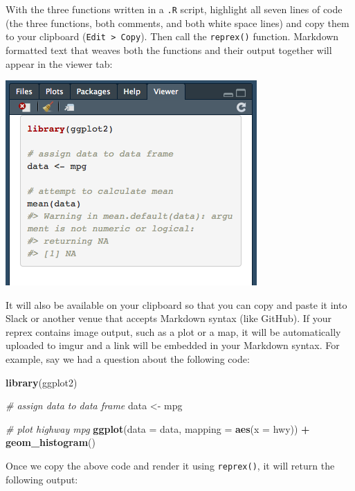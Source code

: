 \documentclass[]{book}
\newenvironment{Shaded}{\begin{snugshade}}{\end{snugshade}}
\newcommand{\KeywordTok}[1]{\textcolor[rgb]{0.13,0.29,0.53}{\textbf{#1}}}
\newcommand{\DataTypeTok}[1]{\textcolor[rgb]{0.13,0.29,0.53}{#1}}
\newcommand{\StringTok}[1]{\textcolor[rgb]{0.31,0.60,0.02}{#1}}
\newcommand{\CommentTok}[1]{\textcolor[rgb]{0.56,0.35,0.01}{\textit{#1}}}
\newcommand{\OperatorTok}[1]{\textcolor[rgb]{0.81,0.36,0.00}{\textbf{#1}}}
\newcommand{\NormalTok}[1]{#1}
\theoremstyle{definition}
\theoremstyle{definition}
\theoremstyle{definition}
\theoremstyle{remark}
\begin{document}
With the three functions written in a \texttt{.R} script, highlight all
seven lines of code (the three functions, both comments, and both white
space lines) and copy them to your clipboard
(\texttt{Edit\ \textgreater{}\ Copy}). Then call the \texttt{reprex()}
function. Markdown formatted text that weaves both the functions and
their output together will appear in the viewer tab:

\begin{center}\includegraphics[width=0.5\linewidth]{images/reprex} \end{center}

It will also be available on your clipboard so that you can copy and
paste it into Slack or another venue that accepts Markdown syntax (like
GitHub). If your reprex contains image output, such as a plot or a map,
it will be automatically uploaded to imgur and a link will be embedded
in your Markdown syntax. For example, say we had a question about the
following code:

\begin{Shaded}
\begin{Highlighting}[]
\KeywordTok{library}\NormalTok{(ggplot2)}

\CommentTok{# assign data to data frame}
\NormalTok{data <-}\StringTok{ }\NormalTok{mpg}

\CommentTok{# plot highway mpg}
\KeywordTok{ggplot}\NormalTok{(}\DataTypeTok{data =}\NormalTok{ data, }\DataTypeTok{mapping =} \KeywordTok{aes}\NormalTok{(}\DataTypeTok{x =}\NormalTok{ hwy)) }\OperatorTok{+}\StringTok{ }
\StringTok{  }\KeywordTok{geom_histogram}\NormalTok{()}
\end{Highlighting}
\end{Shaded}

Once we copy the above code and render it using \texttt{reprex()}, it
will return the following output:
\end{document}
